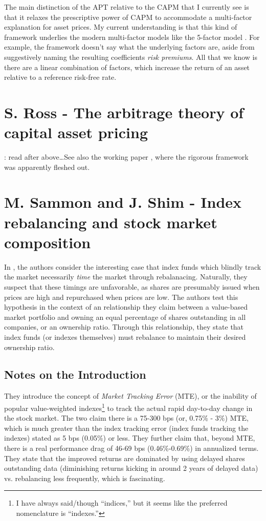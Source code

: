 \documentclass{article}
\begin{document}
The main distinction of the APT relative to the CAPM that I currently see is that it relaxes the prescriptive power of CAPM to accommodate a multi-factor explanation for asset prices.  My current understanding is that this kind of framework underlies the modern multi-factor models like the 5-factor model \cite{Fama2015}.  For example, the framework doesn't say what the underlying factors are, aside from suggestively naming the resulting coefficients {\it risk premiums}.  All that we know is there are a linear combination of factors, which increase the return of an asset relative to a reference risk-free rate.  


\section{S. Ross - The arbitrage theory of capital asset pricing}

\note{[Todo]}: read \cite{Ross1976} after above\ldots  See also the working paper \cite{Ross1971}, where the rigorous framework was apparently fleshed out.


\section{M. Sammon and J. Shim - Index rebalancing and stock market composition}

In \cite{Sammon2026}, the authors consider the interesting case that index funds which blindly track the market necessarily {\it time} the market through rebalanacing.  Naturally, they suspect that these timings are unfavorable, as shares are presumably issued when prices are high and repurchased when prices are low.  The authors test this hypothesis in the context of an relationship they claim between a value-based market portfolio and owning an equal percentage of shares outstanding in all companies, or an ownership ratio.  Through this relationship, they state that index funds (or indexes themselves) must rebalance to maintain their desired ownership ratio.

\subsection{Notes on the Introduction}

They introduce the concept of {\it Market Tracking Error} (MTE), or the inability of popular value-weighted indexes\footnote{I have always said/though ``indices,'' but it seems like the preferred nomenclature is ``indexes.''} to track the actual rapid day-to-day change in the stock market.  The two claim there is a 75-300 bps (or, 0.75\% - 3\%) MTE, which is much greater than the index tracking error (index funds tracking the indexes) stated as 5 bps (0.05\%) or less.  They further claim that, beyond MTE, there is a real performance drag of 46-69 bps (0.46\%-0.69\%) in annualized terms.  They state that the improved returns are dominated by using delayed shares outstanding data (diminishing returns kicking in around 2 years of delayed data) vs. rebalancing less frequently, which is fascinating.
\end{document}
